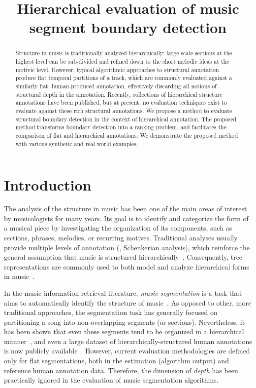\documentclass{article}
\title{Hierarchical evaluation of music segment boundary detection}
\begin{document}
%
\maketitle
%
\begin{abstract}
Structure in music is traditionally analyzed hierarchically: large scale sections at the highest level can be sub-divided and refined down to the short melodic ideas at the motivic level. 
However, typical algorithmic approaches to structural annotation produce flat temporal partitions of a track, which are commonly evaluated against a similarly flat, human-produced
annotation, effectively discarding all notions of structural depth in the annotation.
Recently, collections of hierarchical structure annotations have been published, but at present, no evaluation techniques exist to evaluate against these rich structural annotations.
We propose a method to evaluate structural boundary detection in the context of hierarchical annotation.
The proposed method transforms boundary detection into a ranking problem, and facilitates the comparison of flat and hierarchical annotations.
We demonstrate the proposed method with various synthetic and real world examples. 
\end{abstract}
%
\section{Introduction}\label{sec:introduction}

The analysis of the structure in music has been one of the main areas of interest by musicologists for many years.
Its goal is to identify and categorize the form of a musical piece by investigating the organization of its components, such as sections, phrases, melodies, or recurring motives.
Traditional analyses usually provide multiple levels of annotation (\eg, Schenkerian analysis), which reinforce the general assumption that music is structured hierarchically~\cite{Lerdahl1983a}.
Consequently, tree representations are commonly used to both model and analyze hierarchical forms in music~\cite{Lerdahl1983}.

In the music information retrieval literature, \emph{music segmentation} is a task that aims to automatically identify the structure of music~\cite{Paulus2010}.
As opposed to other, more traditional approaches, the segmentation task has generally focused on partitioning a song into non-overlapping segments (or sections).
Nevertheless, it has been shown that even these segments tend to be organized in a hierarchical manner~\cite{Peeters2009}, and even a large dataset of hierarchically-structured human 
annotations is now publicly available~\cite{Smith2011}.
However, current evaluation methodologies are defined only for flat segmentations, both in the estimation (algorithm output) and reference human annotation data.  Therefore, the
dimension of \emph{depth} has been practically ignored in the evaluation of music segmentation algorithms.
\end{document}
